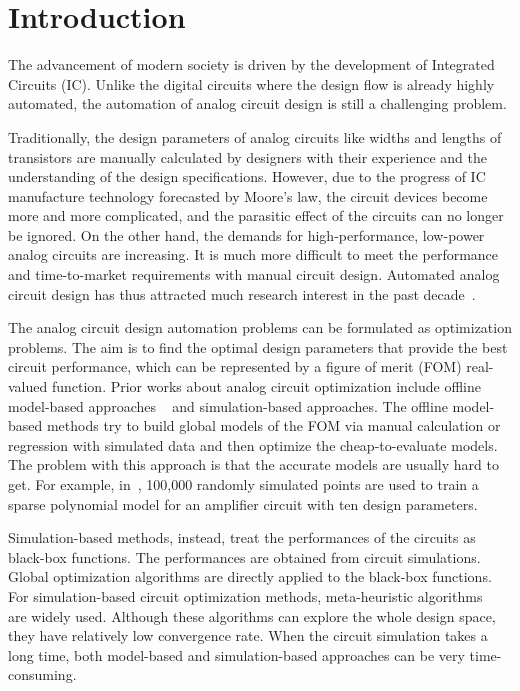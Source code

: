\section{Introduction}

%
The advancement of modern society is driven by the development of Integrated
Circuits (IC). Unlike the digital circuits where the design flow is already
highly automated, the automation of analog circuit design is still a
challenging problem.

Traditionally, the design parameters of analog circuits like widths and lengths of
transistors are manually calculated by designers with their experience and the
understanding of the design specifications. However, due to the progress of IC
manufacture technology forecasted by Moore's law, the circuit devices become
more and more complicated, and the parasitic effect of the circuits can no
longer be ignored. On the other hand, the demands for high-performance,
low-power analog circuits are increasing. It is much more difficult to
meet the performance and time-to-market requirements with manual circuit design.
Automated analog circuit design has thus attracted much research interest in
the past decade~\cite{rutenbar2007hierarchical}.

The analog circuit design automation problems can be formulated as optimization
problems. The aim is to find the optimal design parameters that provide the
best circuit performance, which can be represented by a figure of merit (FOM)
real-valued function. Prior works about analog circuit optimization
include offline model-based approaches
~\cite{colleran2003optimization,daems2003simulation,wang2014enabling} and
simulation-based approaches. The offline model-based methods try to build
global models of the FOM via manual calculation or regression with simulated
data and then optimize the cheap-to-evaluate models. The problem with this
approach is that the accurate models are usually hard to get. For example,
in~\cite{wang2014enabling}, 100,000 randomly simulated points are used to train
a sparse polynomial model for an amplifier circuit with ten design parameters.

Simulation-based methods, instead, treat the performances of the circuits as black-box functions. The performances are obtained from circuit simulations. Global optimization
algorithms are directly applied to the black-box functions. For
simulation-based circuit optimization methods, meta-heuristic
algorithms~\cite{phelps2000anaconda, liu2009analog} are widely used. Although
these algorithms can explore the whole design space, they have relatively low
convergence rate. When the circuit simulation takes a long time, both
model-based and simulation-based approaches can be very time-consuming.

